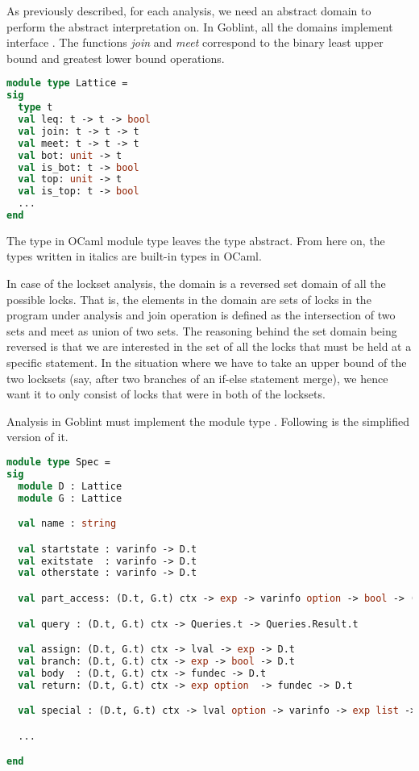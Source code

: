 \documentclass[..thesis.tex]{subfiles}
\begin{document}
As previously described, for each analysis, we need an abstract domain to perform the abstract interpretation on. 
In Goblint, all the domains implement interface .
The functions \textit{join} and \textit{meet} correspond to the binary least upper bound and greatest lower bound operations. 


\begin{lstlisting}[language=Caml,style=caml]
module type Lattice =
sig
  type t
  val leq: t -> t -> bool
  val join: t -> t -> t
  val meet: t -> t -> t
  val bot: unit -> t
  val is_bot: t -> bool
  val top: unit -> t
  val is_top: t -> bool
  ...
end
\end{lstlisting}

The type  in OCaml module type leaves the type abstract. From here on, the types written in italics are built-in types in OCaml. 

In case of the lockset analysis, the domain is a reversed set domain of all the possible locks.
That is, the elements in the domain are sets of locks in the program under analysis and join operation is defined as the intersection of two sets and meet as union of two sets.
The reasoning behind the set domain being reversed is that we are interested in the set of all the locks that must be held at a specific statement.
In the situation where we have to take an upper bound of the two locksets (say, after two branches of an if-else statement merge),
we hence want it to only consist of locks that were in both of the locksets.

Analysis in Goblint must implement the module type . Following is the simplified version of it.

\begin{lstlisting}[language=Caml,style=caml]
module type Spec =
sig
  module D : Lattice
  module G : Lattice

  val name : string

  val startstate : varinfo -> D.t
  val exitstate  : varinfo -> D.t
  val otherstate : varinfo -> D.t

  val part_access: (D.t, G.t) ctx -> exp -> varinfo option -> bool -> (Access.LSSSet.t * Access.LSSet.t)

  val query : (D.t, G.t) ctx -> Queries.t -> Queries.Result.t

  val assign: (D.t, G.t) ctx -> lval -> exp -> D.t
  val branch: (D.t, G.t) ctx -> exp -> bool -> D.t
  val body  : (D.t, G.t) ctx -> fundec -> D.t
  val return: (D.t, G.t) ctx -> exp option  -> fundec -> D.t

  val special : (D.t, G.t) ctx -> lval option -> varinfo -> exp list -> D.t

  ...

end
\end{lstlisting}
\end{document}
